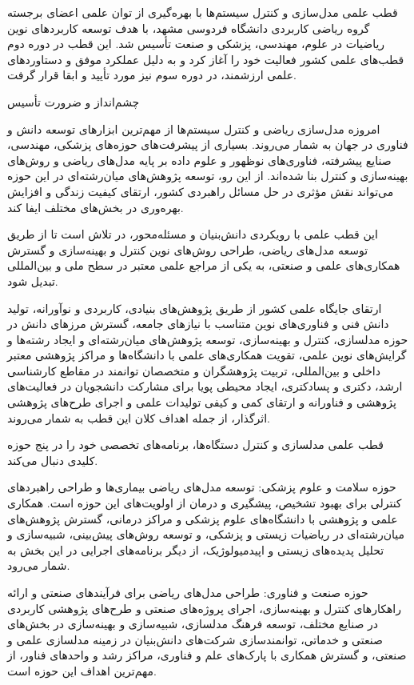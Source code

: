 \documentclass[
  letterpaper,
  DIV=11,
  numbers=noendperiod]{scrreprt}
\begin{document}
قطب علمی مدل‌سازی و کنترل سیستم‌ها با بهره‌گیری از توان علمی اعضای برجسته
گروه ریاضی کاربردی دانشگاه فردوسی مشهد، با هدف توسعه کاربردهای نوین
ریاضیات در علوم، مهندسی، پزشکی و صنعت تأسیس شد. این قطب در دوره دوم
قطب‌های علمی کشور فعالیت خود را آغاز کرد و به دلیل عملکرد موفق و
دستاوردهای علمی ارزشمند، در دوره سوم نیز مورد تأیید و ابقا قرار گرفت.

چشم‌انداز و ضرورت تأسیس

امروزه مدل‌سازی ریاضی و کنترل سیستم‌ها از مهم‌ترین ابزارهای توسعه دانش و
فناوری در جهان به شمار می‌روند. بسیاری از پیشرفت‌های حوزه‌های پزشکی،
مهندسی، صنایع پیشرفته، فناوری‌های نوظهور و علوم داده بر پایه مدل‌های ریاضی
و روش‌های بهینه‌سازی و کنترل بنا شده‌اند. از این رو، توسعه پژوهش‌های
میان‌رشته‌ای در این حوزه می‌تواند نقش مؤثری در حل مسائل راهبردی کشور،
ارتقای کیفیت زندگی و افزایش بهره‌وری در بخش‌های مختلف ایفا کند.

این قطب علمی با رویکردی دانش‌بنیان و مسئله‌محور، در تلاش است تا از طریق
توسعه مدل‌های ریاضی، طراحی روش‌های نوین کنترل و بهینه‌سازی و گسترش
همکاری‌های علمی و صنعتی، به یکی از مراجع علمی معتبر در سطح ملی و
بین‌المللی تبدیل شود.

ارتقای جایگاه علمی کشور از طریق پژوهش‌های بنیادی، کاربردی و نوآورانه،
تولید دانش فنی و فناوری‌های نوین متناسب با نیازهای جامعه، گسترش مرزهای
دانش در حوزه مدلسازی، کنترل و بهینه‌سازی، توسعه پژوهش‌های میان‌رشته‌ای و
ایجاد رشته‌ها و گرایش‌های نوین علمی، تقویت همکاری‌های علمی با دانشگاه‌ها و
مراکز پژوهشی معتبر داخلی و بین‌المللی، تربیت پژوهشگران و متخصصان توانمند
در مقاطع کارشناسی ارشد، دکتری و پسادکتری، ایجاد محیطی پویا برای مشارکت
دانشجویان در فعالیت‌های پژوهشی و فناورانه و ارتقای کمی و کیفی تولیدات
علمی و اجرای طرح‌های پژوهشی اثرگذار، از جمله اهداف کلان این قطب به شمار
می‌روند.

قطب علمی مدلسازی و کنترل دستگاه‌ها، برنامه‌های تخصصی خود را در پنج حوزه
کلیدی دنبال می‌کند.

حوزه سلامت و علوم پزشکی: توسعه مدل‌های ریاضی بیماری‌ها و طراحی راهبردهای
کنترلی برای بهبود تشخیص، پیشگیری و درمان از اولویت‌های این حوزه است.
همکاری علمی و پژوهشی با دانشگاه‌های علوم پزشکی و مراکز درمانی، گسترش
پژوهش‌های میان‌رشته‌ای در ریاضیات زیستی و پزشکی، و توسعه روش‌های پیش‌بینی،
شبیه‌سازی و تحلیل پدیده‌های زیستی و اپیدمیولوژیک، از دیگر برنامه‌های اجرایی
در این بخش به شمار می‌رود.

حوزه صنعت و فناوری: طراحی مدل‌های ریاضی برای فرآیندهای صنعتی و ارائه
راهکارهای کنترل و بهینه‌سازی، اجرای پروژه‌های صنعتی و طرح‌های پژوهشی
کاربردی در صنایع مختلف، توسعه فرهنگ مدلسازی، شبیه‌سازی و بهینه‌سازی در
بخش‌های صنعتی و خدماتی، توانمندسازی شرکت‌های دانش‌بنیان در زمینه مدلسازی
علمی و صنعتی، و گسترش همکاری با پارک‌های علم و فناوری، مراکز رشد و
واحدهای فناور، از مهم‌ترین اهداف این حوزه است.
\end{document}
